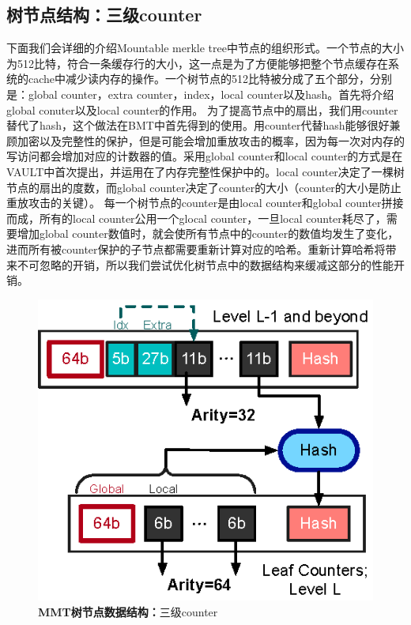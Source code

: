 \subsection{树节点结构：三级counter}
下面我们会详细的介绍Mountable merkle tree中节点的组织形式。一个节点的大小为512比特，符合一条缓存行的大小，这一点是为了方便能够把整个节点缓存在系统的cache中减少读内存的操作。一个树节点的512比特被分成了五个部分，分别是：global counter，extra counter，index，local counter以及hash。首先将介绍global conuter以及local counter的作用。
为了提高节点中的扇出，我们用counter替代了hash，这个做法在BMT中首先得到的使用。用counter代替hash能够很好兼顾加密以及完整性的保护，但是可能会增加重放攻击的概率，因为每一次对内存的写访问都会增加对应的计数器的值。采用global counter和local counter的方式是在VAULT中首次提出，并运用在了内存完整性保护中的。local counter决定了一棵树节点的扇出的度数，而global counter决定了counter的大小（counter的大小是防止重放攻击的关键）。
每一个树节点的counter是由local counter和global counter拼接而成，所有的local counter公用一个glocal counter，一旦local counter耗尽了，需要增加global counter数值时，就会使所有节点中的counter的数值均发生了变化，进而所有被counter保护的子节点都需要重新计算对应的哈希。重新计算哈希将带来不可忽略的开销，所以我们尝试优化树节点中的数据结构来缓减这部分的性能开销。

\begin{figure}[!htp]
  \centering
  \includegraphics[scale=1]{fig/design-hw-mountable-tree-layout.eps}
  \caption{\textbf{MMT树节点数据结构：}三级counter}
 \label{fig:three-level-count.png}
\end{figure}

